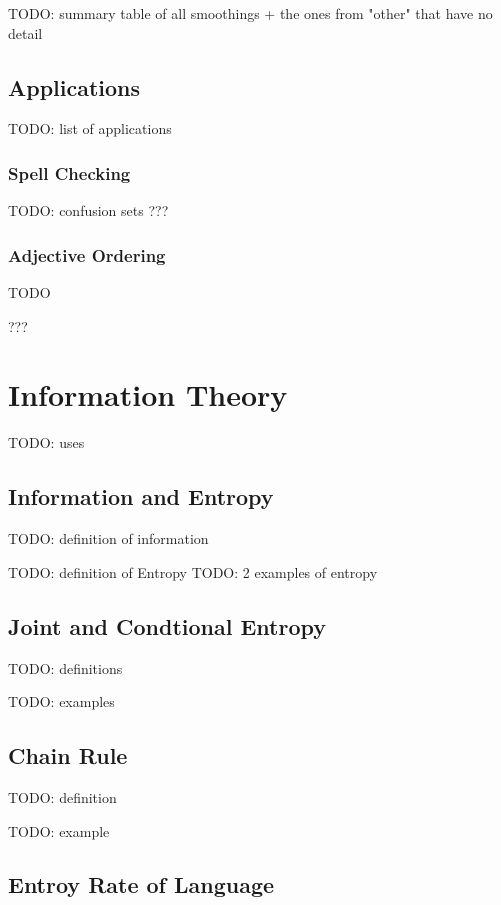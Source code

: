 \documentclass{article}
\begin{document}
TODO: summary table of all smoothings + the ones from "other" that have no detail

\subsection{Applications}

TODO: list of applications

\subsubsection{Spell Checking}

TODO: confusion sets
???

\subsubsection{Adjective Ordering}

TODO

???

\section{Information Theory}

TODO: uses

\subsection{Information and Entropy}

TODO: definition of information

TODO: definition of Entropy
TODO: 2 examples of entropy

\subsection{Joint and Condtional Entropy} 

TODO: definitions

TODO: examples

\subsection{Chain Rule}

TODO: definition

TODO: example

\subsection{Entroy Rate of Language}
\end{document}
